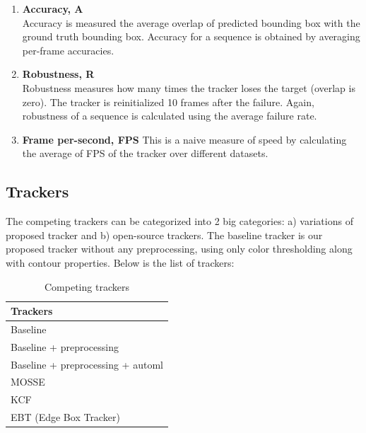 \documentclass[hyp]{socreport}
\begin{document}
\begin{enumerate}

  \item \textbf{Accuracy, A} \\
  Accuracy is measured the average overlap of predicted bounding box with the
  ground truth bounding box. Accuracy for a sequence is obtained by averaging
  per-frame accuracies.
  
  \item \textbf{Robustness, R} \\
  Robustness measures how many times the tracker loses the target (overlap is
  zero). The tracker is reinitialized 10 frames after the failure. Again,
  robustness of a sequence is calculated using the average failure rate.

  \item \textbf{Frame per-second, FPS}
  This is a naive measure of speed by calculating the average of FPS of the
  tracker over different datasets.

\end{enumerate}

\subsection{Trackers}

The competing trackers can be categorized into 2 big categories: a) variations
of proposed tracker and b) open-source trackers. The baseline tracker is our
proposed tracker without any preprocessing, using only color thresholding along
with contour properties. Below is the list of trackers:

\begin{table}[H]
\centering
\begin{tabular}{|l|}
\hline
Trackers                           \\ \hline
Baseline                           \\ \hline
Baseline + preprocessing           \\ \hline
Baseline + preprocessing +  automl \\ \hline
MOSSE                              \\ \hline
KCF                                \\ \hline
EBT (Edge Box Tracker)             \\ \hline
\end{tabular}
\caption{Competing trackers}
\label{table:competing_trackers}
\end{table}
\end{document}
